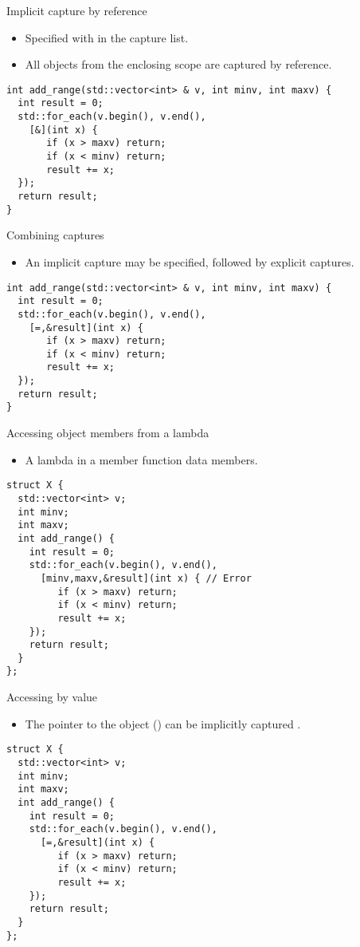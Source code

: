 \begin{frame}[t,fragile]{Implicit capture by reference}
  \begin{itemize}
    \item Specified with \cppid{\&} in the capture list.
    \item All objects from the enclosing scope are captured by reference.
  \end{itemize}
\pause
\begin{lstlisting}[escapechar=@]
int add_range(std::vector<int> & v, int minv, int maxv) {
  int result = 0;
  std::for_each(v.begin(), v.end(),
    [&](int x) {
       if (x > maxv) return;
       if (x < minv) return;
       result += x;
  });
  return result;
}
\end{lstlisting}
\end{frame}

\begin{frame}[t,fragile]{Combining captures}
  \begin{itemize}
    \item An implicit capture may be specified, followed by explicit captures.
  \end{itemize}
\pause
\begin{lstlisting}
int add_range(std::vector<int> & v, int minv, int maxv) {
  int result = 0;
  std::for_each(v.begin(), v.end(),
    [=,&result](int x) {
       if (x > maxv) return;
       if (x < minv) return;
       result += x;
  });
  return result;
}
\end{lstlisting}
\end{frame}

\begin{frame}[t,fragile]{Accessing object members from a lambda}
  \begin{itemize}
    \item A lambda in a member function 
          data members.
  \end{itemize}
\begin{lstlisting}
struct X {
  std::vector<int> v;
  int minv;
  int maxv;
  int add_range() {
    int result = 0;
    std::for_each(v.begin(), v.end(), 
      [minv,maxv,&result](int x) { // Error
         if (x > maxv) return;
         if (x < minv) return;
         result += x;
    });
    return result;
  }
};
\end{lstlisting}
\end{frame}
 
\begin{frame}[t,fragile]{Accessing by value}
  \begin{itemize}
    \item The pointer to the object () can be implicitly captured .
  \end{itemize}
\pause
\begin{lstlisting}
struct X {
  std::vector<int> v;
  int minv;
  int maxv;
  int add_range() {
    int result = 0;
    std::for_each(v.begin(), v.end(), 
      [=,&result](int x) {
         if (x > maxv) return;
         if (x < minv) return;
         result += x;
    });
    return result;
  }
};
\end{lstlisting}
\end{frame}

